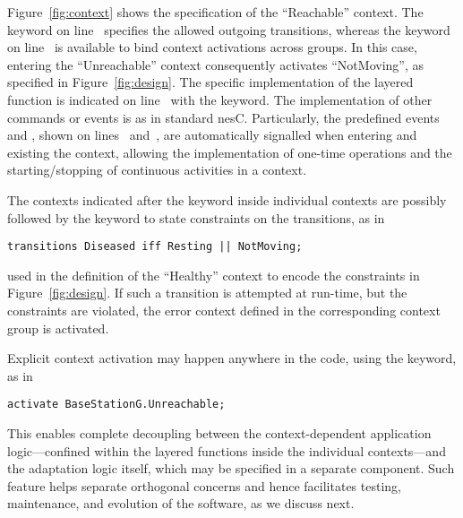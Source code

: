 Figure~\ref{fig:context} shows the \conesc specification of the
``Reachable'' context. The keyword  on
line~ specifies the allowed outgoing transitions, whereas
the keyword  on line~ is available
to bind context activations across groups. In this case, entering the
``Unreachable'' context consequently activates ``NotMoving'', as
specified in Figure~\ref{fig:design}. The specific implementation of
the layered function is indicated on line~ with the
 keyword.  The implementation of other commands or
events is as in standard nesC. Particularly, the predefined events
 and , shown on
lines~ and~, are
automatically signalled when entering and existing the context,
allowing the implementation of one-time operations and the
starting/stopping of continuous activities in a context.

The contexts indicated after the  keyword inside
individual contexts are possibly followed by the  keyword to
state constraints on the transitions, as in
\begin{lstlisting}[language=conesc]
transitions Diseased iff Resting || NotMoving;
\end{lstlisting}
used in the definition of the ``Healthy'' context to encode the
constraints in Figure~\ref{fig:design}. If such a transition is
attempted at run-time, but the constraints are violated, the error
context defined in the corresponding context group is activated. 

Explicit context activation may happen anywhere in the code, using the
 keyword, as in
\begin{lstlisting}[language=conesc]
activate BaseStationG.Unreachable;
\end{lstlisting}
This enables complete decoupling between the context-de\-pen\-dent
application logic---confined within the layered functions inside the
individual contexts---and the adaptation logic itself, which may be
specified in a separate component. Such feature helps separate
orthogonal concerns and hence facilitates testing, maintenance,
and evolution of the software, as we discuss next.

